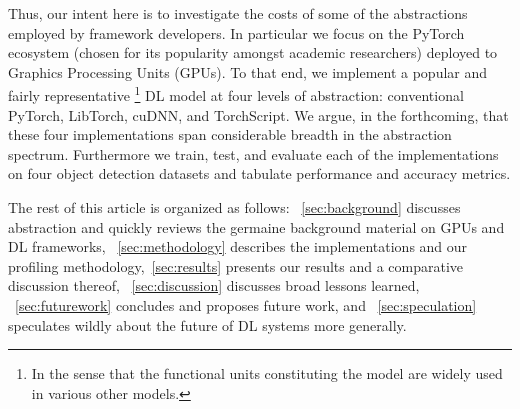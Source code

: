 Thus, our intent here is to investigate the costs of some of the abstractions employed by framework developers.
In particular we focus on the PyTorch ecosystem (chosen for its popularity amongst academic researchers) deployed to Graphics Processing Units (GPUs).
To that end, we implement a popular and fairly representative%
\footnote{In the sense that the functional units constituting the model are widely used in various other models.}
DL model at four levels of abstraction: conventional PyTorch, LibTorch, cuDNN, and TorchScript.
We argue, in the forthcoming, that these four implementations span considerable breadth in the abstraction spectrum.
Furthermore we train, test, and evaluate each of the implementations on four object detection datasets and tabulate performance and accuracy metrics.

The rest of this article is organized as follows: ~\cref{sec:background} discusses abstraction and quickly reviews the germaine background material on GPUs and DL frameworks, ~\cref{sec:methodology} describes the implementations and our profiling methodology,~\cref{sec:results} presents our results and a comparative discussion thereof, ~\cref{sec:discussion} discusses broad lessons learned, ~\cref{sec:futurework} concludes and proposes future work, and ~\cref{sec:speculation} speculates wildly about the future of DL systems more generally.

